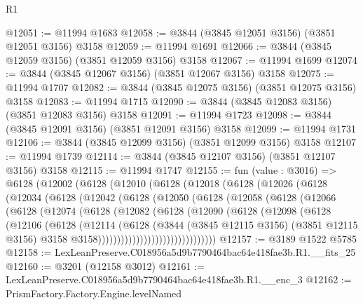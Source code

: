 \begin{lexlean}{R1}
\begin{coremodule}
@12051 := @11994 @1683
@12058 := @3844 (@3845 @12051 @3156) (@3851 @12051 @3156) @3158
@12059 := @11994 @1691
@12066 := @3844 (@3845 @12059 @3156) (@3851 @12059 @3156) @3158
@12067 := @11994 @1699
@12074 := @3844 (@3845 @12067 @3156) (@3851 @12067 @3156) @3158
@12075 := @11994 @1707
@12082 := @3844 (@3845 @12075 @3156) (@3851 @12075 @3156) @3158
@12083 := @11994 @1715
@12090 := @3844 (@3845 @12083 @3156) (@3851 @12083 @3156) @3158
@12091 := @11994 @1723
@12098 := @3844 (@3845 @12091 @3156) (@3851 @12091 @3156) @3158
@12099 := @11994 @1731
@12106 := @3844 (@3845 @12099 @3156) (@3851 @12099 @3156) @3158
@12107 := @11994 @1739
@12114 := @3844 (@3845 @12107 @3156) (@3851 @12107 @3156) @3158
@12115 := @11994 @1747
@12155 := fun (value : @3016) =>
  @6128
    (@12002
      (@6128
        (@12010
          (@6128
            (@12018
              (@6128
                (@12026
                  (@6128
                    (@12034
                      (@6128
                        (@12042
                          (@6128
                            (@12050
                              (@6128
                                (@12058
                                  (@6128
                                    (@12066
                                      (@6128
                                        (@12074
                                          (@6128
                                            (@12082
                                              (@6128
                                                (@12090
                                                  (@6128
                                                    (@12098
                                                      (@6128
                                                        (@12106
                                                          (@6128
                                                            (@12114
                                                              (@6128
                                                                (@3844
                                                                  (@3845 @12115 @3156)
                                                                  (@3851 @12115 @3156)
                                                                  @3158
                                                                  @3158)))))))))))))))))))))))))))))))
@12157 := @3189 @1522 @5785
@12158 := LexLeanPreserve.C018956a5d9b7790464bac64e418fae3b.R1.__fits_25
@12160 := @3201 (@12158 @3012)
@12161 := LexLeanPreserve.C018956a5d9b7790464bac64e418fae3b.R1.__enc_3
@12162 := PrismFactory.Factory.Engine.levelNamed

\end{coremodule}
\end{lexlean}
